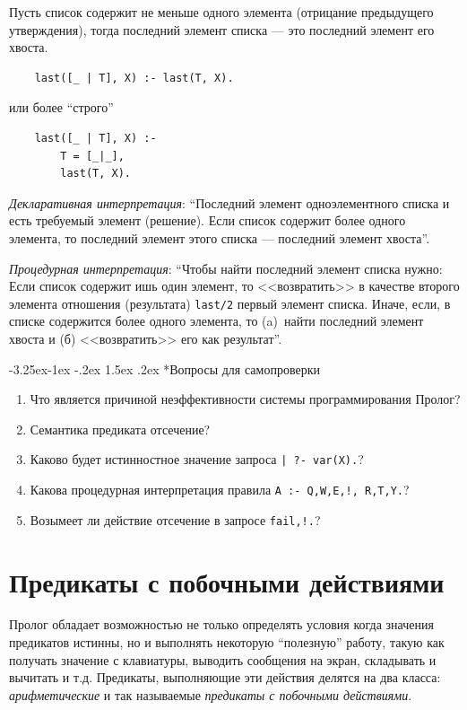 \documentclass[12pt, openany, twoside]{book} %
\makeatletter
\renewcommand\subsubsection{\@startsection{subsubsection}{3}{\z@}%
                                     {-3.25ex\@plus -1ex \@minus -.2ex}%
                                     {1.5ex \@plus .2ex}%
                                     {\normalfont\normalsize\bfseries}}
\newenvironment{questions}{\subsubsection*{Вопросы для самопроверки}\begin{enumerate}}{\end{enumerate}}
\makeatother
\begin{document}
Пусть список содержит не меньше одного элемента (отрицание предыдущего утверждения), тогда последний элемент списка --- это последний элемент его хвоста.

{\tt\begin{verbatim}
    last([_ | T], X) :- last(T, X).
\end{verbatim}}
\noindent или более ``строго''
{\tt\begin{verbatim}
    last([_ | T], X) :-
        T = [_|_],
        last(T, X).
\end{verbatim}}\emph{Декларативная интерпретация}: ``Последний элемент одноэлементного списка и есть требуемый элемент (решение). Если список содержит более одного элемента, то последний элемент этого списка --- последний элемент хвоста''.

\emph{Процедурная интерпретация}: ``Чтобы найти последний элемент списка нужно: Если список содержит ишь один элемент, то <<возвратить>> в качестве второго элемента отношения (результата) {\tt last/2} первый элемент списка. Иначе, если, в списке содержится более одного элемента, то (a)~найти последний элемент хвоста и (б) <<возвратить>> его как результат''.

\begin{questions}
\item{} Что является причиной неэффективности системы программирования Пролог?
\item{} Семантика предиката отсечение?
\item{} Каково будет истинностное значение запроса \texttt{| ?- var(X).}?
\item{} Какова процедурная интерпретация правила \texttt{A :- Q,W,E,!, R,T,Y.}?
\item{} Возымеет ли действие отсечение в запросе \texttt{fail,!.}?
\end{questions}

\chapter{Предикаты с побочными действиями}
Пролог обладает возможностью не только определять условия когда значения предикатов истинны, но и выполнять некоторую ``полезную'' работу, такую как получать значение с клавиатуры, выводить сообщения на экран, складывать и вычитать и т.д. Предикаты, выполняющие эти действия делятся на два класса: {\em арифметические} и так называемые {\em предикаты с побочными действиями}.
\end{document}
